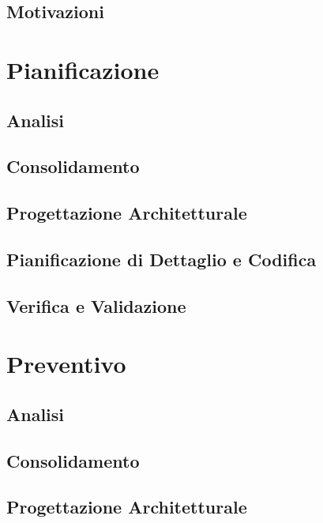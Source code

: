 \documentclass[a4paper, oneside, openany, dvipsnames, table]{article}
\begin{document}
	\subsection{Motivazioni}
		
\newpage
\section{Pianificazione}
	\label{sec:Pian}
	
	\newpage	
	\subsection{Analisi}
		
	\newpage	
	\subsection{Consolidamento}
		
	\newpage
	\subsection{Progettazione Architetturale}
		
	\newpage
	\subsection{Pianificazione di Dettaglio e Codifica}
		
	\newpage
	\subsection{Verifica e Validazione}
		
\newpage
\section{Preventivo}
	
	\newpage
	\subsection{Analisi}
	    
	\newpage	
	\subsection{Consolidamento}
	    
	\newpage
	\subsection{Progettazione Architetturale}
	    
	\newpage
\end{document}
